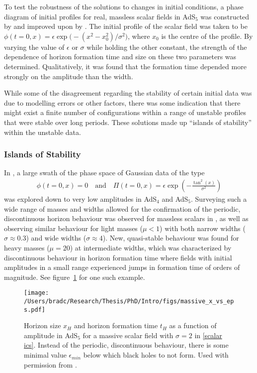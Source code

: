 \documentclass[../PhD.tex]{subfiles}
\begin{document}
To test the robustness of the solutions to changes in initial conditions, a phase diagram of initial profiles for real, massless scalar fields in AdS$_5$ was constructed by \cite{1106.2339} and improved upon by \cite{1110.5823}. The initial profile of the scalar field was taken to be $\phi(t=0, x) = \epsilon \exp \big( -(x^2 - x_0^2) / \sigma^2 \big)$, where $x_0$ is the centre of the profile. By varying the value of $\epsilon$ or $\sigma$ while holding the other constant, the strength of the dependence of horizon formation time and size on these two parameters was determined. Qualitatively, it was found that the formation time depended more strongly on the amplitude than the width. 

While some of the disagreement regarding the stability of certain initial data was due to modelling errors or other factors, there was some indication that there might exist a finite number of configurations within a range of unstable profiles that were stable over long periods. These solutions made up ``islands of stability'' within the unstable data.

\subsubsection{Islands of Stability}
\label{ssub: islands}
 
In \cite{1508.02709}, a large swath of the phase space of Gaussian data of the type
\begin{align}
\label{scalar ics}
\phi(t=0,x) = 0 \quad \text{and} \quad \Pi (t=0,x) = \epsilon \exp \left( - \frac{\tan^2 (x)}{\sigma^2} \right)
\end{align}
was explored down to very low amplitudes in AdS$_4$ and AdS$_5$. Surveying such a wide range of masses and widths allowed for the confirmation of the periodic, discontinuous horizon behaviour was observed for massless scalars in \cite{1104.3702}, as well as observing similar behaviour for light masses ($\mu < 1$) with both narrow widths ($\sigma \approx 0.3$) and wide widths ($\sigma \approx 4$). New, quasi-stable behaviour was found for heavy masses ($\mu = 20$) at intermediate widths, which was characterized by discontinuous behaviour in horizon formation time where fields with initial amplitudes in a small range experienced jumps in formation time of orders of magnitude. See figure~\ref{fig: massive x vs eps} for one such example.

\begin{figure}[h]
	\centering
	\texttt{[image: /Users/bradc/Research/Thesis/PhD/Intro/figs/massive\_x\_vs\_eps.pdf]}
	\caption[Horizon size and horizon formation time for a massive scalar]{Horizon size $x_H$ and horizon formation time $t_H$ as a function of amplitude in AdS$_5$ for a massive scalar field with $\sigma = 2$ in {\rm\eqref{scalar ics}}. Instead of the periodic, discontinuous behaviour, there is some minimal value $\epsilon_{min}$ below which black holes to not form. Used with permission from {\rm\cite{1508.02709}}.}
	\label{fig: massive x vs eps}
\end{figure}
\end{document}
